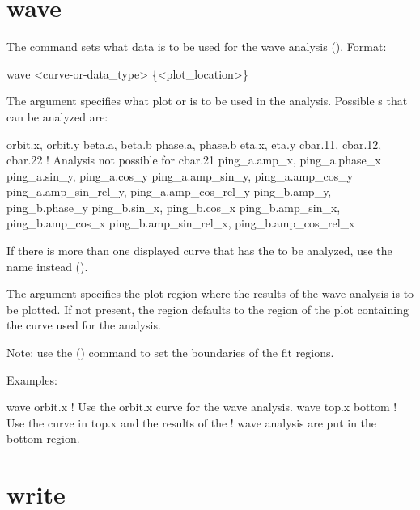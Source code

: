 {{{{{{{{{{{{\section{wave}
\label{s:wave}

The  command sets what data is to be used for the wave analysis (). 
Format:
\begin{example}
  wave <curve-or-data_type> \{<plot_location>\}
\end{example}

\vskip 7pt

The  argument specifies what plot  or  is to be
used in the analysis. Possible s that can be analyzed are:
\begin{example}
  orbit.x, orbit.y
  beta.a,  beta.b
  phase.a, phase.b
  eta.x, eta.y
  cbar.11, cbar.12, cbar.22      ! Analysis not possible for cbar.21
  ping_a.amp_x, ping_a.phase_x
  ping_a.sin_y, ping_a.cos_y
  ping_a.amp_sin_y, ping_a.amp_cos_y
  ping_a.amp_sin_rel_y, ping_a.amp_cos_rel_y
  ping_b.amp_y, ping_b.phase_y
  ping_b.sin_x, ping_b.cos_x
  ping_b.amp_sin_x, ping_b.amp_cos_x
  ping_b.amp_sin_rel_x, ping_b.amp_cos_rel_x
\end{example}
If there is more than one displayed curve that has the  to be analyzed, use the
 name instead ().

The  argument specifies the plot region where the results of the wave analysis
is to be plotted. If not present, the region defaults to the region of the plot containing the curve
used for the analysis.

Note: use the  () command to set the boundaries of the fit regions.

Examples:
\begin{example}
  wave orbit.x      ! Use the orbit.x curve for the wave analysis.
  wave top.x bottom ! Use the curve in top.x and the results of the 
                    !  wave analysis are put in the bottom region.
\end{example}


\section{write}
\label{s:write}

}}}}}}}}}}}}
